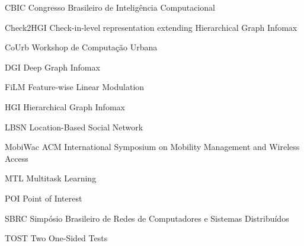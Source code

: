     \begin{siglas}
        \item[CBIC] Congresso Brasileiro de Intelig\^encia Computacional
        \item[Check2HGI] Check-in-level representation extending Hierarchical Graph Infomax
        \item[CoUrb] Workshop de Computa\c{c}\~ao Urbana
        \item[DGI] Deep Graph Infomax
        \item[FiLM] Feature-wise Linear Modulation
        \item[HGI] Hierarchical Graph Infomax
        \item[LBSN] Location-Based Social Network
        \item[MobiWac] ACM International Symposium on Mobility Management and Wireless Access
        \item[MTL] Multitask Learning
        \item[POI] Point of Interest
        \item[SBRC] Simp\'osio Brasileiro de Redes de Computadores e Sistemas Distribu\'idos
        \item[TOST] Two One-Sided Tests
    \end{siglas}
    \cleardoublepage

    \tableofcontents*
    \cleardoublepage

    \textual
    \ifdefensebuild\else
    \pagestyle{abntheadings}
    \setcounter{page}{\finalbuildfirstpage}
    \fi

